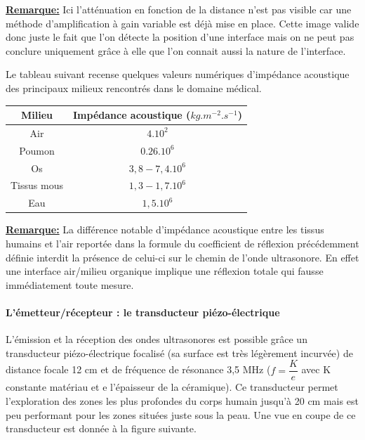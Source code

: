 \documentclass[12pt]{article}
\begin{document}
\underline{\textbf{Remarque:}} Ici l'atténuation en fonction de la distance n'est pas visible car une méthode d'amplification à gain variable est déjà mise en place. Cette image valide donc juste le fait que l'on détecte la position d'une interface mais on ne peut pas conclure uniquement grâce à elle que l'on connait aussi la nature de l'interface.\par
\vspace{10pt}

Le tableau suivant recense quelques valeurs numériques d'impédance acoustique des principaux milieux rencontrés dans le domaine médical.
\begin{center}
\begin{tabular}{|c|c|}
  \hline
  Milieu & Impédance acoustique ($kg.m^{-2}.s^{-1}$) \\
  \hline
  Air & $4.10^{2}$ \\ \hline
  Poumon & $0.26.10^{6}$  \\
  \hline
  Os & $3,8-7,4.10^{6}$ \\ \hline
  Tissus mous & $1,3-1,7.10^{6}$  \\
  \hline
  Eau & $1,5.10^{6}$ \\ \hline
 
\end{tabular}
\end{center}

\vspace{10pt}

\underline{\textbf{Remarque:}} La différence notable d'impédance acoustique entre les tissus humains et l'air reportée dans la formule du coefficient de réflexion précédemment définie interdit la présence de celui-ci sur le chemin de l'onde ultrasonore. En effet une interface air/milieu organique implique une réflexion totale qui fausse immédiatement toute mesure.

\newpage
\paragraph{L'émetteur/récepteur : le transducteur piézo-électrique}

L'émission et la réception des ondes ultrasonores est possible grâce un transducteur piézo-électrique focalisé (sa surface est très légèrement incurvée) de distance focale 12 cm et de fréquence de résonance 3,5 MHz ($f = \dfrac{K}{e}$ avec K constante matériau et e l'épaisseur de la céramique). 
Ce transducteur permet l'exploration des zones les plus profondes du corps humain jusqu'à 20 cm mais est peu performant pour les zones situées juste sous la peau. Une vue en coupe de ce transducteur est donnée à la figure suivante.
\end{document}

